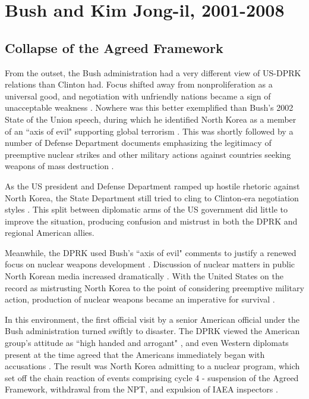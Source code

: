 \section{Bush and Kim Jong-il, 2001-2008}

\subsection{Collapse of the Agreed Framework}

From the outset, the Bush administration had a very different view of US-DPRK relations than Clinton had. Focus shifted away from nonproliferation as a universal good, and negotiation with unfriendly nations became a sign of unacceptable weakness \cite{bleiker}. Nowhere was this better exemplified than Bush's 2002 State of the Union speech, during which he identified North Korea as a member of an ``axis of evil" supporting global terrorism \cite{sotu02}. This was shortly followed by a number of Defense Department documents emphasizing the legitimacy of preemptive nuclear strikes and other military actions against countries seeking weapons of mass destruction \cite{bleiker,npreview}.

As the US president and Defense Department ramped up hostile rhetoric against North Korea, the State Department still tried to cling to Clinton-era negotiation styles \cite{harnisch,armitage}. This split between diplomatic arms of the US government did little to improve the situation, producing confusion and mistrust in both the DPRK and regional American allies.

Meanwhile, the DPRK used Bush's ``axis of evil" comments to justify a renewed focus on nuclear weapons development \cite{bleiker}. Discussion of nuclear matters in public North Korean media increased dramatically \cite{rich14}. With the United States on the record as mistrusting North Korea to the point of considering preemptive military action, production of nuclear weapons became an imperative for survival \cite{hecker2}.

In this environment, the first official visit by a senior American official under the Bush administration turned swiftly to disaster. The DPRK viewed the American group's attitude as ``high handed and arrogant" \cite{kcna3}, and even Western diplomats present at the time agreed that the Americans immediately began with accusations \cite{bleiker}. The result was North Korea admitting to a nuclear program, which set off the chain reaction of events comprising cycle 4 - suspension of the Agreed Framework, withdrawal from the NPT, and expulsion of IAEA inspectors \cite{iaea09}. 

